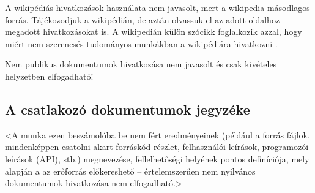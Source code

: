\documentclass[a4paper,oneside]{article}
\begin{document}
A wikipédiás hivatkozások használata nem javasolt, mert a wikipedia
másodlagos forrás.  Tájékozodjuk a wikipédián, de aztán olvassuk el az
adott oldalhoz megadott hivatkozásokat is.  A wikipedián külön szócikk
foglalkozik azzal, hogy miért nem szerencsés tudományos munkákban a
wikipédiára hivatkozni \cite{wikipedia}.

Nem publikus dokumentumok hivatkozása nem javasolt és csak kivételes
helyzetben elfogadható!

\subsection{A csatlakozó dokumentumok jegyzéke}
\label{sec:csat-irod}

<A munka ezen beszámolóba be nem fért eredményeinek (például a forrás
fájlok, mindenképpen csatolni akart forráskód részlet, felhasználói
leírások, programozói leírások (API), stb.) megnevezése,
fellelhetőségi helyének pontos definíciója, mely alapján a az
erőforrás előkereshető -- értelemszerűen nem nyilvános dokumentumok
hivatkozása nem elfogadható.>
\end{document}
